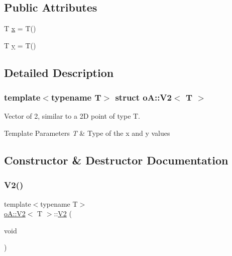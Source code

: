 \subsection*{Public Attributes}
\begin{DoxyCompactItemize}
\item 
T \mbox{\hyperlink{structo_a_1_1_v2_ac1fdde8edfc1fdf4181450eb85795088}{x}} = T()
\item 
T \mbox{\hyperlink{structo_a_1_1_v2_a9437a06af6b8e5407e361b6bfc067225}{y}} = T()
\end{DoxyCompactItemize}


\subsection{Detailed Description}
\subsubsection*{template$<$typename T$>$\newline
struct o\+A\+::\+V2$<$ T $>$}

Vector of 2, similar to a 2D point of type T. 


\begin{DoxyTemplParams}{Template Parameters}
{\em T} & Type of the x and y values \\
\hline
\end{DoxyTemplParams}


\subsection{Constructor \& Destructor Documentation}
\mbox{\label{structo_a_1_1_v2_a6b62d1b3e8de957a3c2d26925b6508e1}} 
\subsubsection{\texorpdfstring{V2()}{V2()}\hspace{0.1cm}{\footnotesize\ttfamily [1/3]}}
{\footnotesize\ttfamily template$<$typename T$>$ \\
\mbox{\hyperlink{structo_a_1_1_v2}{o\+A\+::\+V2}}$<$ T $>$\+::\mbox{\hyperlink{structo_a_1_1_v2}{V2}} (\begin{DoxyParamCaption}\item[{void}]{ }\end{DoxyParamCaption})\hspace{0.3cm}{\ttfamily [default]}}



